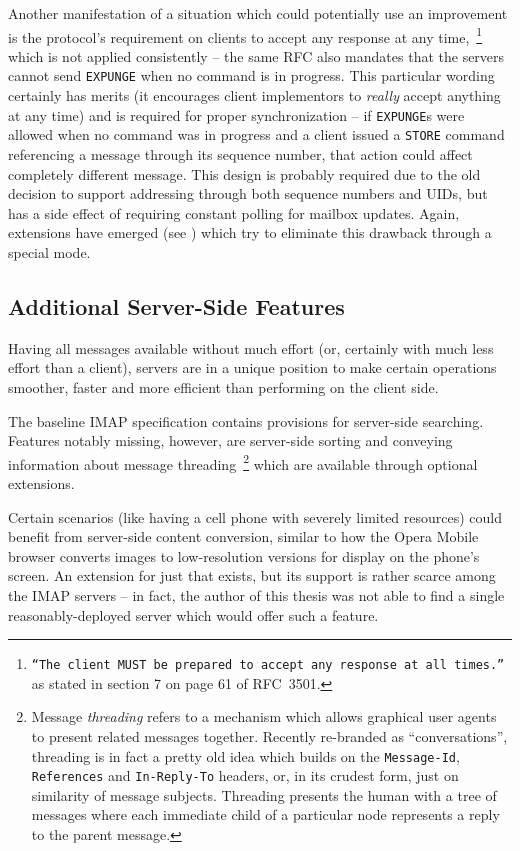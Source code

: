 \documentclass[trojita]{subfiles}
\begin{document}
Another manifestation of a situation which could potentially use an improvement is the protocol's requirement on clients
to accept any response at any time,~\footnote{{\tt ``The client MUST be prepared to accept any response at all times.''}
as stated in section 7 on page 61 of RFC~3501.} which is not applied consistently -- the same RFC also mandates that the
servers cannot send {\tt EXPUNGE} when no command is in progress.  This particular wording certainly has merits
(it encourages client implementors to {\em really} accept anything at any time) and is required for proper
synchronization -- if {\tt EXPUNGE}s were allowed when no command was in progress and a client issued a {\tt STORE}
command referencing a message through its sequence number, that action could affect completely different message.  This
design is probably required due to the old decision to support addressing through both sequence numbers and UIDs, but
has a side effect of requiring constant polling for mailbox updates.  Again, extensions have emerged (see
) which try to eliminate this drawback through a special mode.

\subsection{Additional Server-Side Features}

Having all messages available without much effort (or, certainly with much less effort than a client), servers are in a
unique position to make certain operations smoother, faster and more efficient than performing on the client side.

The baseline IMAP specification contains provisions for server-side searching.  Features notably missing, however, are
server-side sorting and conveying information about message threading~\footnote{Message {\em threading} refers to a
mechanism which allows graphical user agents to present related messages together.  Recently re-branded as
``conversations'', threading is in fact a pretty old idea which builds on the {\tt Message-Id}, {\tt References} and
{\tt In-Reply-To} headers, or, in its crudest form, just on similarity of message subjects.  Threading presents the
human with a tree of messages where each immediate child of a particular node represents a reply to the parent message.}
which are available through optional extensions.

Certain scenarios (like having a cell phone with severely limited resources) could benefit from server-side content
conversion, similar to how the Opera Mobile browser converts images to low-resolution versions for display on the
phone's screen.  An extension for just that exists, but its support is rather scarce among the IMAP servers -- in fact,
the author of this thesis was not able to find a single reasonably-deployed server which would offer such a feature.
\end{document}
